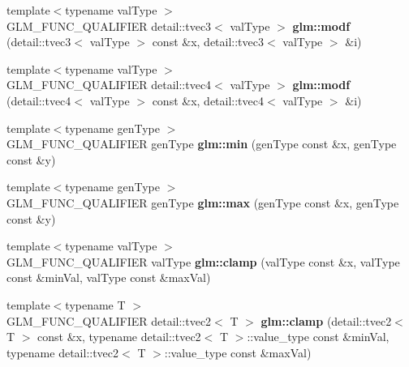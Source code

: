 \begin{DoxyCompactItemize}
\item 
\hypertarget{namespaceglm_a0d5f8bb5115eaca517b697509de396df}{{\footnotesize template$<$typename val\-Type $>$ }\\\-G\-L\-M\-\_\-\-F\-U\-N\-C\-\_\-\-Q\-U\-A\-L\-I\-F\-I\-E\-R \*
detail\-::tvec3$<$ val\-Type $>$ {\bfseries glm\-::modf} (detail\-::tvec3$<$ val\-Type $>$ const \&x, detail\-::tvec3$<$ val\-Type $>$ \&i)}\label{namespaceglm_a0d5f8bb5115eaca517b697509de396df}

\item 
\hypertarget{namespaceglm_a6c9328d6bc7d557600ec52f2e5115ef5}{{\footnotesize template$<$typename val\-Type $>$ }\\\-G\-L\-M\-\_\-\-F\-U\-N\-C\-\_\-\-Q\-U\-A\-L\-I\-F\-I\-E\-R \*
detail\-::tvec4$<$ val\-Type $>$ {\bfseries glm\-::modf} (detail\-::tvec4$<$ val\-Type $>$ const \&x, detail\-::tvec4$<$ val\-Type $>$ \&i)}\label{namespaceglm_a6c9328d6bc7d557600ec52f2e5115ef5}

\item 
\hypertarget{namespaceglm_ac8f406f7b7c7d92fc851c3dcafd23e41}{{\footnotesize template$<$typename gen\-Type $>$ }\\\-G\-L\-M\-\_\-\-F\-U\-N\-C\-\_\-\-Q\-U\-A\-L\-I\-F\-I\-E\-R gen\-Type {\bfseries glm\-::min} (gen\-Type const \&x, gen\-Type const \&y)}\label{namespaceglm_ac8f406f7b7c7d92fc851c3dcafd23e41}

\item 
\hypertarget{namespaceglm_a9610b4053d584062e0c609083aa7a03d}{{\footnotesize template$<$typename gen\-Type $>$ }\\\-G\-L\-M\-\_\-\-F\-U\-N\-C\-\_\-\-Q\-U\-A\-L\-I\-F\-I\-E\-R gen\-Type {\bfseries glm\-::max} (gen\-Type const \&x, gen\-Type const \&y)}\label{namespaceglm_a9610b4053d584062e0c609083aa7a03d}

\item 
\hypertarget{namespaceglm_a435097f73fa7b698ddc54945bfba1c34}{{\footnotesize template$<$typename val\-Type $>$ }\\\-G\-L\-M\-\_\-\-F\-U\-N\-C\-\_\-\-Q\-U\-A\-L\-I\-F\-I\-E\-R val\-Type {\bfseries glm\-::clamp} (val\-Type const \&x, val\-Type const \&min\-Val, val\-Type const \&max\-Val)}\label{namespaceglm_a435097f73fa7b698ddc54945bfba1c34}

\item 
\hypertarget{namespaceglm_ae7c2c75cfb6649f39e832598cb0842f8}{{\footnotesize template$<$typename T $>$ }\\\-G\-L\-M\-\_\-\-F\-U\-N\-C\-\_\-\-Q\-U\-A\-L\-I\-F\-I\-E\-R \*
detail\-::tvec2$<$ \-T $>$ {\bfseries glm\-::clamp} (detail\-::tvec2$<$ \-T $>$ const \&x, typename detail\-::tvec2$<$ \-T $>$\-::value\-\_\-type const \&min\-Val, typename detail\-::tvec2$<$ \-T $>$\-::value\-\_\-type const \&max\-Val)}\label{namespaceglm_ae7c2c75cfb6649f39e832598cb0842f8}


\end{DoxyCompactItemize}
